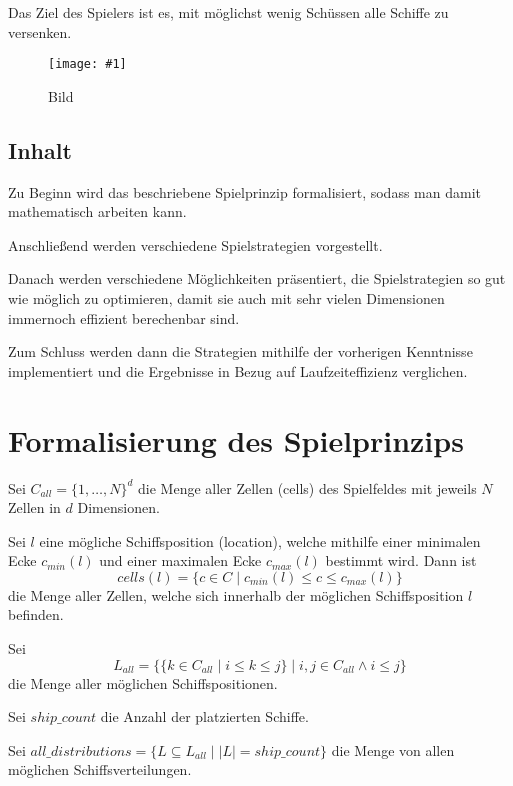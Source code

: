 \documentclass[a4paper,12pt]{llncs}
\numberwithin{equation}{section}
\newcommand{\bildbreite}[5]{
  \begin{figure}[htbp]
    \begin{center}
      \texttt{[image: \#1]}
      \caption[#5]{#4}
      \label{#3}
    \end{center}
  \end{figure}
}
\begin{document}
Das Ziel des Spielers ist es, mit möglichst wenig Schüssen alle Schiffe zu versenken.

\bildbreite{figures/einleitung.jpg}{15cm}{Einleitung}{Bild}{as}

\subsection{Inhalt}
Zu Beginn wird das beschriebene Spielprinzip formalisiert, sodass man damit mathematisch arbeiten kann.

Anschließend werden verschiedene Spielstrategien vorgestellt.

Danach werden verschiedene Möglichkeiten präsentiert, die Spielstrategien so gut wie möglich zu optimieren, damit sie auch mit sehr vielen Dimensionen immernoch effizient berechenbar sind.

Zum Schluss werden dann die Strategien mithilfe der vorherigen Kenntnisse implementiert und die Ergebnisse in Bezug auf Laufzeiteffizienz verglichen.

\section{Formalisierung des Spielprinzips}

\begin{definition}
Sei $C_{all}=\{1, \dots, N\}^d$ die Menge aller Zellen (cells) des Spielfeldes mit jeweils $N$ Zellen in $d$ Dimensionen.
\end{definition}

\begin{definition}
Sei $l$ eine mögliche Schiffsposition (location), welche mithilfe einer minimalen Ecke $c_{min}(l)$ und einer maximalen Ecke $c_{max}(l)$ bestimmt wird. Dann ist
\[
cells(l)=
\{
c
\in
C
\mid
c_{min}(l) \leq c \leq c_{max}(l)
\}
\]
die Menge aller Zellen, welche sich innerhalb der möglichen Schiffsposition $l$ befinden.
\end{definition}

\begin{definition}
Sei 
\[
L_{all}=
\{
\{
k
\in
C_{all}
\mid
i \leq k \leq j
\}
\mid
i,j \in C_{all}
\wedge
i \leq j
\}
\] die Menge aller möglichen Schiffspositionen.
\end{definition}

\begin{definition}
Sei $ship\_count$ die Anzahl der platzierten Schiffe.
\end{definition}

\begin{definition}
Sei $all\_distributions=\{L \subseteq L_{all} \mid |L|=ship\_count\}$ die Menge von allen möglichen Schiffsverteilungen.
\end{definition}
\end{document}
